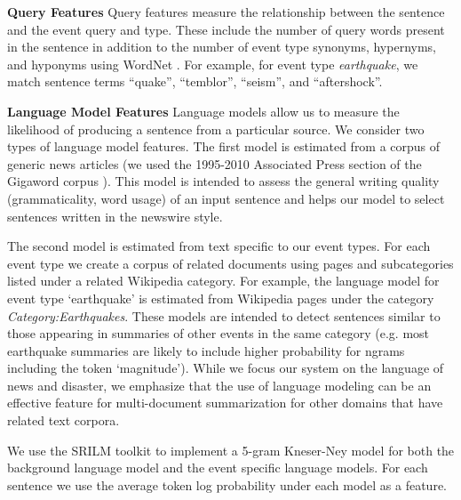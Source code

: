 \textbf{Query Features}
Query features measure the relationship between the sentence and the event 
query and type.  These include the number of query words present in the 
sentence in addition to the number of event type synonyms, hypernyms, and 
hyponyms using WordNet \cite{miller1995wordnet}.  
For example, for event type \emph{earthquake},  we match sentence terms 
``quake'', ``temblor'', ``seism'', and ``aftershock''.

\textbf{Language Model Features}\label{subsubsec:lm}
Language models allow us to measure the likelihood of producing a sentence 
from a particular source.  We consider two types of language model 
features.  The first model is estimated from a corpus of generic news 
articles (we used the 1995-2010 Associated Press section of the 
Gigaword corpus \cite{graff2003english}).  
This model is intended to assess the general writing quality (grammaticality, word usage) of an input sentence and helps our model to select sentences
written in the newswire style.  

The second model is estimated from text specific to our event types.  
For each event type we create a corpus of related documents using pages
and subcategories listed under a related Wikipedia category.
For example, the language model for event type `earthquake' is estimated 
from Wikipedia pages under the category \emph{Category:Earthquakes}.  
These models are intended to detect sentences similar to those appearing in 
summaries of other events in the same category 
(e.g. most earthquake summaries are likely to include higher probability for 
ngrams including the token `magnitude'). While we focus our system on the 
language of news and disaster, we emphasize that the use of language modeling 
can be an effective feature for multi-document summarization for other 
domains that have related text corpora.




We use the SRILM toolkit \cite{stolcke2002srilm} to implement a 5-gram Kneser-Ney model for both
the background language model and the event specific language models.
For each sentence we use the average token log probability under each model
as a feature.





